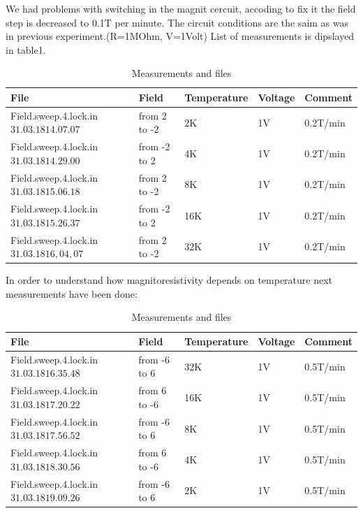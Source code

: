 \documentclass[idxtotoc,hyperref,openany,oneside]{labbook} %
\begin{document}
We had problems with switching in the magnit cercuit, accoding to fix it the field step is decreased to 0.1T per minute.
The circuit conditions are the saim as was in previous experiment.(R=1MOhm, V=1Volt)
List of measurements is dipslayed in  table1.
 \begin{table}[H]
\begin{tabular}{l l l l l}
\toprule
\textbf{File} & \textbf{Field} & \textbf{Temperature}& \textbf{Voltage}& \textbf{Comment}\\
\toprule
Field.sweep.4.lock.in$31.03.18 14.07.07$& from 2 to -2  & 2K & 1V& 0.2T/min\\
Field.sweep.4.lock.in$31.03.18 14.29.00$& from -2 to 2  & 4K & 1V& 0.2T/min\\
Field.sweep.4.lock.in$31.03.18 15.06.18$& from 2 to -2  & 8K & 1V& 0.2T/min\\
Field.sweep.4.lock.in$31.03.18 15.26.37$& from -2 to 2  & 16K & 1V& 0.2T/min\\
Field.sweep.4.lock.in$31.03.18 16,04,07$& from 2 to -2  & 32K& 1V& 0.2T/min\\
\bottomrule
\end{tabular}
\caption{Measurements and files}
\label{tab:Measurements and files}
\end{table}
In order to understand how magnitoresistivity depends on temperature next measurements have been done:
\begin{table}[H]
\begin{tabular}{l l l l l}
\toprule
\textbf{File} & \textbf{Field} & \textbf{Temperature}& \textbf{Voltage}& \textbf{Comment}\\
\toprule

Field.sweep.4.lock.in$31.03.18 16.35.48$& from -6 to 6  & 32K & 1V& 0.5T/min\\
Field.sweep.4.lock.in$31.03.18 17.20.22$& from 6 to -6  & 16K & 1V& 0.5T/min\\
Field.sweep.4.lock.in$31.03.18 17.56.52$& from -6 to 6  & 8K & 1V& 0.5T/min\\
Field.sweep.4.lock.in$31.03.18 18.30.56$& from 6 to -6  & 4K& 1V& 0.5T/min\\
Field.sweep.4.lock.in$31.03.18 19.09.26$& from -6 to 6  & 2K& 1V& 0.5T/min\\
\bottomrule
\end{tabular}
\caption{Measurements and files}
\label{tab:Measurements and files}
\end{table}
\end{document}
